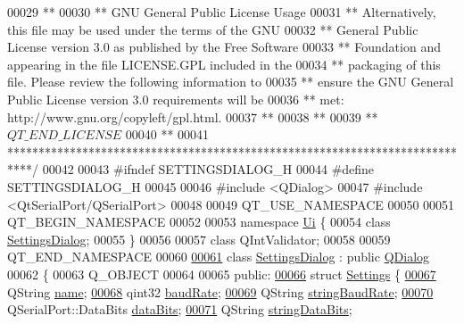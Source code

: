\begin{DoxyCode}
00029 \textcolor{comment}{**}
00030 \textcolor{comment}{** GNU General Public License Usage}
00031 \textcolor{comment}{** Alternatively, this file may be used under the terms of the GNU}
00032 \textcolor{comment}{** General Public License version 3.0 as published by the Free Software}
00033 \textcolor{comment}{** Foundation and appearing in the file LICENSE.GPL included in the}
00034 \textcolor{comment}{** packaging of this file.  Please review the following information to}
00035 \textcolor{comment}{** ensure the GNU General Public License version 3.0 requirements will be}
00036 \textcolor{comment}{** met: http://www.gnu.org/copyleft/gpl.html.}
00037 \textcolor{comment}{**}
00038 \textcolor{comment}{**}
00039 \textcolor{comment}{** $QT\_END\_LICENSE$}
00040 \textcolor{comment}{**}
00041 \textcolor{comment}{****************************************************************************/}
00042 
00043 \textcolor{preprocessor}{#ifndef SETTINGSDIALOG\_H}
00044 \textcolor{preprocessor}{#define SETTINGSDIALOG\_H}
00045 
00046 \textcolor{preprocessor}{#include <QDialog>}
00047 \textcolor{preprocessor}{#include <QtSerialPort/QSerialPort>}
00048 
00049 QT\_USE\_NAMESPACE
00050 
00051 QT\_BEGIN\_NAMESPACE
00052 
00053 \textcolor{keyword}{namespace }\hyperlink{a00145}{Ui} \{
00054 \textcolor{keyword}{class }\hyperlink{a00075}{SettingsDialog};
00055 \}
00056 
00057 \textcolor{keyword}{class }QIntValidator;
00058 
00059 QT\_END\_NAMESPACE
00060 
\hypertarget{a00132_source_l00061}{}\hyperlink{a00075}{00061} \textcolor{keyword}{class }\hyperlink{a00075}{SettingsDialog} : \textcolor{keyword}{public} \hyperlink{a00051}{QDialog}
00062 \{
00063     Q\_OBJECT
00064 
00065 \textcolor{keyword}{public}:
\hypertarget{a00132_source_l00066}{}\hyperlink{a00075}{00066}     \textcolor{keyword}{struct }\hyperlink{a00075_dc/d9a/a00218}{Settings} \{
\hypertarget{a00132_source_l00067}{}\hyperlink{a00075_a973c8cfb942a512f34fc4227c0caa6dd}{00067}         QString \hyperlink{a00075_a973c8cfb942a512f34fc4227c0caa6dd}{name};
\hypertarget{a00132_source_l00068}{}\hyperlink{a00075_ac19cc9431552857a75c657a464ba0700}{00068}         qint32 \hyperlink{a00075_ac19cc9431552857a75c657a464ba0700}{baudRate};
\hypertarget{a00132_source_l00069}{}\hyperlink{a00075_a54e9d461f783386f314bc24b96665e53}{00069}         QString \hyperlink{a00075_a54e9d461f783386f314bc24b96665e53}{stringBaudRate};
\hypertarget{a00132_source_l00070}{}\hyperlink{a00075_a7dcd85d028a09508cb4567cf631b40e9}{00070}         QSerialPort::DataBits \hyperlink{a00075_a7dcd85d028a09508cb4567cf631b40e9}{dataBits};
\hypertarget{a00132_source_l00071}{}\hyperlink{a00075_ab589b733b78af17744ab75067bfce051}{00071}         QString \hyperlink{a00075_ab589b733b78af17744ab75067bfce051}{stringDataBits};

\end{DoxyCode}
